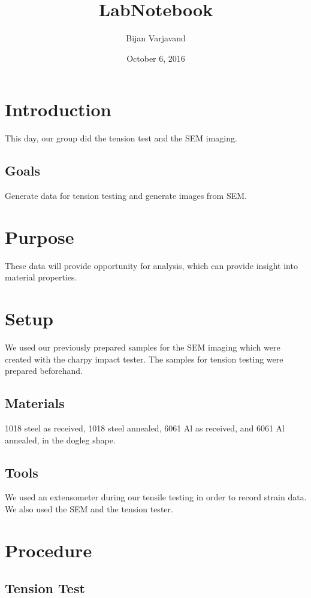 \documentclass{article}
\author{Bijan Varjavand}
\title{LabNotebook}
\date{October 6, 2016}
\begin{document}
\maketitle

\section{Introduction}

This day, our group did the tension test and the SEM imaging.
\subsection{Goals}

Generate data for tension testing and generate images from SEM.
\section{Purpose}

These data will provide opportunity for analysis, which can provide insight into material properties.
\section{Setup}

We used our previously prepared samples for the SEM imaging which were created with the charpy impact tester.
The samples for tension testing were prepared beforehand.
\subsection{Materials}

1018 steel as received, 1018 steel annealed, 6061 Al as received, and 6061 Al annealed, in the dogleg shape.
\subsection{Tools}

We used an extensometer during our tensile testing in order to record strain data. We also used the SEM and the tension tester.
\section{Procedure}

\subsection{Tension Test}
\end{document}
